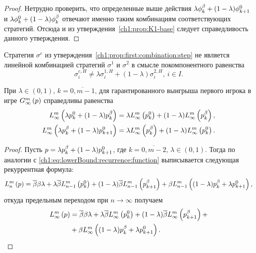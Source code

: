 {\begin{proof}
  Нетрудно проверить, что определенные выше действия $\lambda \fOdd + (1-\lambda) \fEven[k+1]$ и $\lambda \fEven + (1-\lambda) \fOdd$ отвечают именно таким комбинациям соответствующих стратегий.
  Отсюда и из утверждения~\ref{ch1:prop:K1-base} следует справедливость данного утверждения.
\end{proof}

\begin{remark}
  Стратегия $\sigma^c$ из утверждения~\ref{ch1:prop:first:combination:step} не является линейной комбинацией стратегий $\sigma^1$ и $\sigma^2$ в смысле покомпонентного равенства 
  \[
    \sigma^{c,H}_i \neq \lambda \sigma^{1,H}_i + (1-\lambda) \sigma^{2,H}_i,\ i \in I.
  \]
\end{remark}

\begin{proposition}
  \label{ch1:prop:first:combination:game}
  При $\lambda \in (0, 1), \, k = \overline{0, m-1}$, для гарантированного выигрыша первого игрока в игре $\infiniteGame{p}$ справедливы равенства
  \begin{align*}
    \lowerBound{\lambda \pEven + (1-\lambda) \pOdd}      
    &= 
      \lambda \lowerBound{\pEven} + (1-\lambda) \lowerBound{\pOdd}, \\
    \lowerBound{\lambda \pOdd + (1-\lambda) \pEven[k+1]} 
    &= \lambda \lowerBound{\pOdd} + (1-\lambda) \lowerBound{\pEven}.
  \end{align*}
\end{proposition}
\begin{proof}
  Пусть $p = \lambda \pOdd + (1-\lambda) \pEven[k+1]$, где $k = \overline{0, m - 2}, \, \lambda \in (0, 1)$.
  Тогда по аналогии с \eqref{ch1:eq:lowerBound:recurrence:function} выписывается следующая рекуррентная формула:
  \begin{equation*}
    \lowerBound[n]{p} = \DCo \Co \lambda + \lambda \DCo
    \lowerBound[n-1]{\pEven} + (1-\lambda) \DCo \lowerBound[n-1]{\pOdd[k+1]} +
    \Co \lowerBound[n-1]{(1-\lambda) \pOdd + \lambda \pEven[k+1]},
  \end{equation*}
  откуда предельным переходом при $n \rightarrow \infty$ получаем
  \begin{equation}
    \label{ch1:eq:prop:L(comb)}
    \begin{aligned}
    \lowerBound{p} 
    &= \DCo \Co \lambda +
    \lambda \DCo \lowerBound{\pEven} +
    (1-\lambda) \DCo \lowerBound{\pOdd[k+1]} + \\
    &+ \Co \lowerBound{(1-\lambda) \pOdd + \lambda \pEven[k+1]}.
    \end{aligned}
  \end{equation}
  

\end{proof}}
